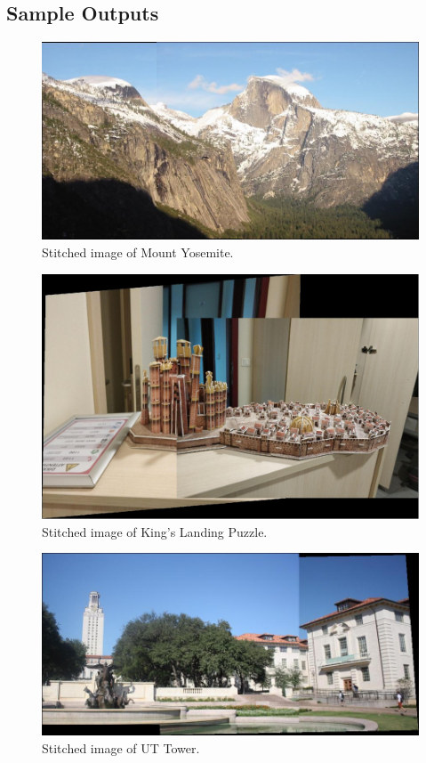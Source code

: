 \documentclass{article}
\begin{document}
\subsection{Sample Outputs}
\begin{figure}[!htb]
  \centering
  \includegraphics[width=.99\textwidth]{yosemite1_2_stitched.jpg}
  \caption{Stitched image of Mount Yosemite.}
\end{figure}%
\begin{figure}[!htb]
  \centering
  \includegraphics[width=.99\textwidth]{got1_2_stitched.png}
  \caption{Stitched image of King's Landing Puzzle.}
\end{figure}%
\newpage
\begin{figure}[!htb]
  \centering
  \includegraphics[width=.99\textwidth]{uttower1_2_stitched.jpg}
  \caption{Stitched image of UT Tower.}
\end{figure}%
\newpage
\end{document}
